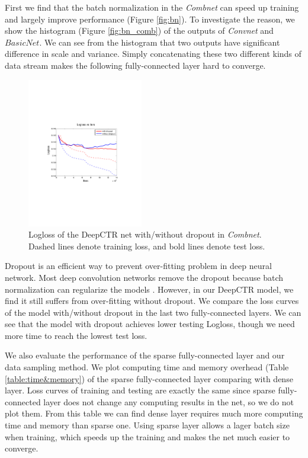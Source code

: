 \documentclass{sig-alternate-05-2015}
\begin{document}
First we find that the batch normalization in the \emph{Combnet} can speed up training and largely improve performance (Figure \ref{fig:bn}). To investigate the reason, we show the histogram (Figure \ref{fig:bn_comb}) of the outputs of \emph{Convnet} and $BasicNet$. We can see from the histogram  that two outputs have significant difference in scale and variance. Simply concatenating  these two different kinds of data stream  makes the following fully-connected layer hard to converge. 
\begin{figure}
	\centering
	\includegraphics[width=0.45\textwidth]{dropout_test_train_embed}
	\caption{Logloss of the DeepCTR net with/without dropout in \emph{Combnet}. Dashed lines denote training loss, and bold lines denote test loss.}
	\label{fig:dropout}
\end{figure}

Dropout \cite{srivastava2014dropout} is an efficient way to prevent over-fitting problem in deep neural network. Most deep convolution networks remove the dropout because batch normalization can regularize the models \cite{he2015deep, ioffe2015batch}. However, in our DeepCTR model, we find it still suffers from over-fitting without dropout. We compare the loss curves of the model with/without dropout in the last two fully-connected layers. We can see that the model with dropout achieves lower testing Logloss, though we need more time to reach the lowest test loss.


We also evaluate the performance of the sparse fully-connected layer and our data sampling method. We plot computing time and memory overhead (Table \ref{table:time&memory}) of the sparse fully-connected layer comparing with dense layer. Loss curves of training and testing are exactly the same since sparse fully-connected layer does not change any computing results in the net, so we do not plot them. From this table we can find dense layer  requires much more computing time and memory than sparse one. Using sparse layer allows a lager batch size when training, which speeds up the training and makes the net much easier to converge. 
\end{document}
